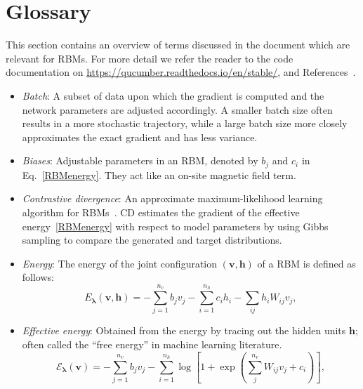 \documentclass[submission, Phys, hidelnks]{SciPost}
\begin{document}
\appendix

\section{Glossary}\label{Glossary}
This section contains an overview of terms discussed in the document which are
relevant for RBMs. For more detail we refer the reader to the code documentation
on \url{https://qucumber.readthedocs.io/en/stable/}, and
References~\cite{hinton_training_2002, hinton2012practical}.

\begin{itemize}

\item \textit{Batch}: A subset of data upon which the gradient is computed and
the network parameters are adjusted accordingly. A smaller batch size often
results in a more stochastic trajectory, while a large batch size more closely
approximates the exact gradient and has less variance.

\item \textit{Biases}: Adjustable parameters in an RBM, denoted by $b_j$ and
$c_i$ in Eq.~\eqref{RBMenergy}. They act like an on-site magnetic field term.

\item \textit{Contrastive divergence}: An approximate maximum-likelihood
learning algorithm for RBMs~\cite{hinton_training_2002}. CD estimates the
gradient of the effective energy~\eqref{RBMenergy} with respect to model
parameters by using Gibbs sampling to compare the generated and target
distributions.

\item \textit{Energy}: The energy of the joint configuration $(\bm{v}, \bm{h})$
of a RBM is defined as follows:
\begin{equation}
   E_{\bm{\lambda}}(\bm{v},\bm{h}) = - \sum\limits_{j=1}^{n_v} b_j v_j - \sum\limits_{i=1}^{n_h} c_i h_i - \sum\limits_{ij} h_i W_{ij} v_j, \label{RBMenergy}
\end{equation}

\item \textit{Effective energy}: Obtained from the energy by tracing out the
hidden units $\bm{h}$; often called the ``free energy'' in machine learning
literature.
\begin{equation}
   \mathcal{E}_{\bm{\lambda}}(\bm{v}) = - \sum\limits_{j=1}^{n_v} b_j v_j - \sum\limits_{i=1}^{n_h} \log \left[ 1 + \exp \left( \sum\limits_{j}^{n_v} W_{ij}v_j +c_i\right) \right], \label{RBMeffectiveenergy}
\end{equation}


\end{itemize}
\end{document}
